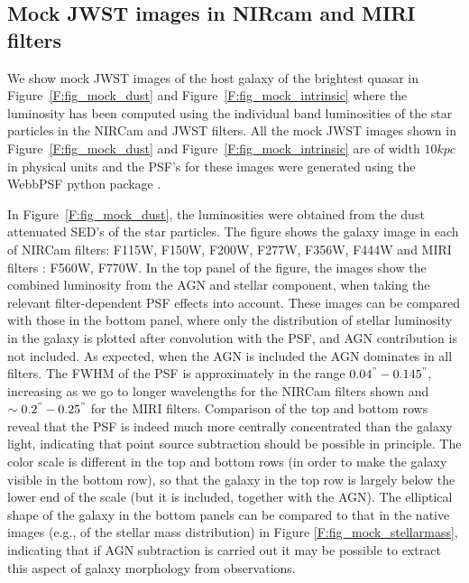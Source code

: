 \documentclass[twocolumn,useAMS,usenatbib]{mnras} \usepackage{natbib}
\begin{document}
\subsection{Mock JWST images in NIRcam and MIRI filters}

We show mock JWST images of the host galaxy of the brightest quasar in Figure~\ref{F:fig_mock_dust} and Figure~\ref{F:fig_mock_intrinsic} where the luminosity has been computed using the individual band luminosities of the star particles in the NIRCam and JWST filters.
All the mock JWST images shown in Figure~\ref{F:fig_mock_dust} and Figure~\ref{F:fig_mock_intrinsic} are of width $10 kpc$ in physical units and the PSF's for these images were generated using the WebbPSF python package \citep{2015ascl.soft04007P}.

In Figure~\ref{F:fig_mock_dust}, the luminosities were obtained from the dust attenuated SED's of the star particles. The figure shows the galaxy image in each of NIRCam filters: F115W, F150W, F200W, F277W, F356W, F444W and MIRI filters : F560W, F770W. 
In the top panel of the figure, the images show the combined luminosity from the AGN and stellar component, when taking the relevant filter-dependent PSF effects into account. These images can be compared with those in the bottom panel, where only the distribution of stellar luminosity in the galaxy is plotted after convolution with the PSF, and AGN contribution is not included. 
As expected, when the AGN is included the AGN dominates in all filters. The FWHM of the PSF is approximately in the range $0.04^{"}- 0.145^{"}$, increasing as we go to longer wavelengths for the NIRCam filters shown and $\sim 0.2^{"} - 0.25^{"}$ for the MIRI filters. Comparison of the top and bottom rows reveal that the PSF is indeed much more centrally concentrated than the galaxy light, indicating that point source subtraction should be possible in
principle. The color scale is different in the top and bottom rows (in order to make the galaxy visible in the bottom row), so that the galaxy in the top row is largely below the lower end of the scale (but it is included, together with the AGN). The elliptical shape of the galaxy in the bottom panels can be compared to that in the native images (e.g., of the stellar mass distribution) in Figure \ref{F:fig_mock_stellarmass}, indicating that if AGN subtraction is carried out it may be possible to extract this aspect of galaxy 
morphology from observations.
\end{document}

